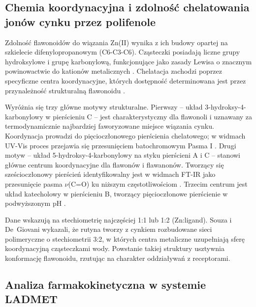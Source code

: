 \documentclass[12pt,a4paper]{article}
\begin{document}
\subsection{Chemia koordynacyjna i zdolność chelatowania jonów cynku przez polifenole}

Zdolność flawonoidów do wiązania Zn(II) wynika z ich budowy opartej na szkielecie difenylopropanowym (C6-C3-C6). Cząsteczki posiadają liczne grupy hydroksylowe i grupę karbonylową, funkcjonujące jako zasady Lewisa o znacznym powinowactwie do kationów metalicznych \cite{wei2014, walencik2024}. Chelatacja zachodzi poprzez specyficzne centra koordynacyjne, których dostępność determinowana jest przez przynależność strukturalną flawonoidu \cite{lapouge2006}.

Wyróżnia się trzy główne motywy strukturalne. Pierwszy -- układ 3-hydroksy-4-karbonylowy w pierścieniu C -- jest charakterystyczny dla flawonoli i uznawany za termodynamicznie najbardziej faworyzowane miejsce wiązania cynku. Koordynacja prowadzi do pięcioczłonowego pierścienia chelatowego; w widmach UV-Vis proces przejawia się przesunięciem batochromowym Pasma I \cite{golonko2024, walencik2024}. Drugi motyw -- układ 5-hydroksy-4-karbonylowy na styku pierścieni A i C -- stanowi główne centrum koordynacyjne dla flawonów i flawanonów. Tworzący się sześcioczłonowy pierścień identyfikowalny jest w widmach FT-IR jako przesunięcie pasma $\nu$(C=O) ku niższym częstotliwościom \cite{woznicka2025, bamigboye2020}. Trzecim centrum jest układ katecholowy w pierścieniu B, tworzący pięcioczłonowe pierścienie w podwyższonym pH \cite{wang2021, lungu2023}.

Dane wskazują na stechiometrię najczęściej 1:1 lub 1:2 (Zn:ligand). Souza i De~Giovani \cite{souza2005} wykazali, że rutyna tworzy z cynkiem rozbudowane sieci polimeryczne o stechiometrii 3:2, w których centra metaliczne uzupełniają sferę koordynacyjną cząsteczkami wody. Powstanie takiej struktury usztywnia konformację flawonoidu, rzutując na charakter oddziaływań z receptorami.

\subsection{Analiza farmakokinetyczna w systemie LADMET}
\end{document}
